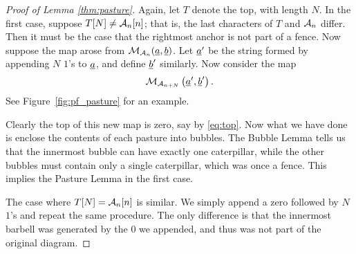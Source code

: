 \begin{proof}[Proof of Lemma \ref{thm:pasture}]
	Again, let $T$ denote the top, with length $N$.  In the first case, suppose $T[N] \neq \AA_n[n]$; that is, the last characters of $T$ and $\AA_n$ differ.  Then it must be the case that the rightmost anchor is not part of a fence.
	Now suppose the map arose from $\MM_{\AA_n}(\ul a, \ul b)$.  Let $\ul a'$ be the string formed by appending $N$ $1$'s to $\ul a$, and define $\ul b'$ similarly.  Now consider the map \[ \MM_{\AA_{n+N}} \left( \ul a', \ul b' \right). \]  See Figure~\ref{fig:pf_pasture} for an example.

	Clearly the top of this new map is zero, say by \eqref{eq:top}.  Now what we have done is enclose the contents of each pasture into bubbles.  The Bubble Lemma tells us that the innermost bubble can have exactly one caterpillar, while the other bubbles must contain only a single caterpillar, which was once a fence.  This implies the Pasture Lemma in the first case.

	The case where $T[N] = \AA_n[n]$ is similar.  We simply append a zero followed by $N$ $1$'s and repeat the same procedure.  The only difference is that the innermost barbell was generated by the $0$ we appended, and thus was not part of the original diagram.
\end{proof}




